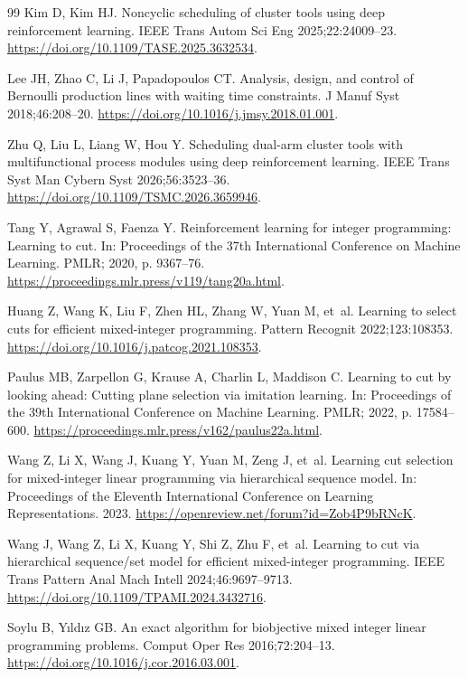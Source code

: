 \documentclass[final,5p,times,twocolumn]{elsarticle}
\begin{document}
\begin{thebibliography}{99}
Kim D, Kim HJ. Noncyclic scheduling of cluster tools using deep reinforcement learning.
IEEE Trans Autom Sci Eng 2025;22:24009--23.
\url{https://doi.org/10.1109/TASE.2025.3632534}.

Lee JH, Zhao C, Li J, Papadopoulos CT. Analysis, design, and control of {Bernoulli} production lines with waiting time constraints.
J Manuf Syst 2018;46:208--20.
\url{https://doi.org/10.1016/j.jmsy.2018.01.001}.

Zhu Q, Liu L, Liang W, Hou Y. Scheduling dual-arm cluster tools with multifunctional process modules using deep reinforcement learning. IEEE Trans Syst Man Cybern Syst 2026;56:3523--36. \url{https://doi.org/10.1109/TSMC.2026.3659946}.

Tang Y, Agrawal S, Faenza Y. Reinforcement learning for integer programming: Learning to cut.
In: Proceedings of the 37th International Conference on Machine Learning. PMLR; 2020, p. 9367--76.
\url{https://proceedings.mlr.press/v119/tang20a.html}.

Huang Z, Wang K, Liu F, Zhen HL, Zhang W, Yuan M, et~al. Learning to select cuts for efficient mixed-integer programming.
Pattern Recognit 2022;123:108353.
\url{https://doi.org/10.1016/j.patcog.2021.108353}.

Paulus MB, Zarpellon G, Krause A, Charlin L, Maddison C. Learning to cut by looking ahead: Cutting plane selection via imitation learning.
In: Proceedings of the 39th International Conference on Machine Learning. PMLR; 2022, p. 17584--600.
\url{https://proceedings.mlr.press/v162/paulus22a.html}.

Wang Z, Li X, Wang J, Kuang Y, Yuan M, Zeng J, et~al. Learning cut selection for mixed-integer linear programming via hierarchical sequence model.
In: Proceedings of the Eleventh International Conference on Learning Representations. 2023.
\url{https://openreview.net/forum?id=Zob4P9bRNcK}.

Wang J, Wang Z, Li X, Kuang Y, Shi Z, Zhu F, et~al. Learning to cut via hierarchical sequence/set model for efficient mixed-integer programming. IEEE Trans Pattern Anal Mach Intell 2024;46:9697--9713. \url{https://doi.org/10.1109/TPAMI.2024.3432716}.

Soylu B, Yıldız GB. An exact algorithm for biobjective mixed integer linear programming problems.
Comput Oper Res 2016;72:204--13.
\url{https://doi.org/10.1016/j.cor.2016.03.001}.


\end{thebibliography}
\end{document}
